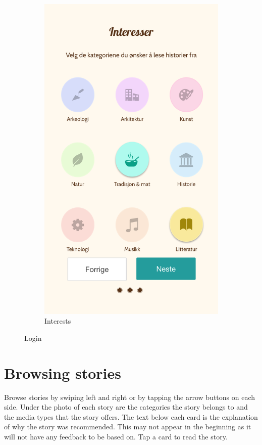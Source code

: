 \begin{appendices}
\begin{figure}[h!]
\begin{subfigure}[h]{0.32\textwidth}
			\includegraphics[width=\textwidth]{fig/screenshot_interests}
			\caption{Interests}
		\end{subfigure}
		\caption{Login}
		\label{fig:manual_login}
	\end{figure}

\clearpage
\section{Browsing stories}
Browse stories by swiping left and right or by tapping the arrow buttons on each side. Under the photo of each story are the categories the story belongs to and the media types that the story offers. The text below each card is the explanation of why the story was recommended. This may not appear in the beginning as it will not have any feedback to be based on. Tap a card to read the story.\newline


\end{appendices}
